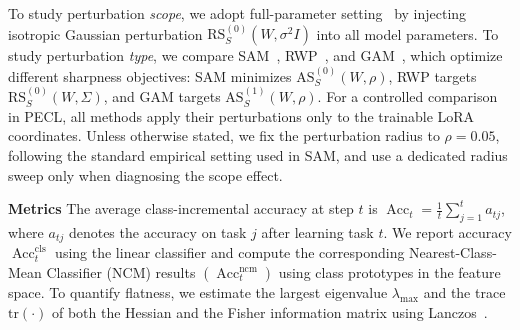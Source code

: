 \documentclass[10pt]{article} %
\begin{document}
To study perturbation \emph{scope}, we adopt {full-parameter} setting~\cite{li2024flatlora} by injecting isotropic Gaussian perturbation $\mathrm{RS}_S^{(0)}({W}, \sigma^2 
I)$ into all model parameters.
To study perturbation \emph{type}, we compare SAM~\cite{foretSharpnessAwareMinimizationEfficiently2021}, RWP~\cite{pmlr-v151-bisla22a}, and GAM~\cite{Zhang_GAM}, which optimize different sharpness objectives: SAM minimizes $\mathrm{AS}^{(0)}_S(W,\rho)$, RWP targets $\mathrm{RS}^{(0)}_S(W,\Sigma)$, and GAM targets $\mathrm{AS}^{(1)}_S(W,\rho)$. For a controlled comparison in PECL, all methods apply their perturbations only to the trainable LoRA coordinates.
Unless otherwise stated, we fix the perturbation radius to $\rho=0.05$, following the standard empirical setting used in SAM, and use a dedicated radius sweep only when diagnosing the scope effect.




\noindent\textbf{Metrics}\quad
The average class-incremental accuracy at step $t$ is
$
\operatorname{Acc}_t = \frac{1}{t} \sum_{j=1}^{t} a_{tj}
$,  where $a_{tj}$ denotes the accuracy on task $j$ after learning task $t$. 
We report accuracy $\operatorname{Acc}_t^{\mathrm{cls}}$ using the linear classifier and
compute the corresponding Nearest-Class-Mean Classifier (NCM) results
$(\operatorname{Acc}_t^{\mathrm{ncm}})$ using class prototypes in the feature space.
To quantify flatness, we estimate the largest eigenvalue $\lambda_{\max}$ and the trace $\mathrm{tr}(\cdot)$ of both the Hessian and the Fisher information matrix using Lanczos~\cite{ghorbaniInvestigationNeuralNet2019}.
\end{document}
